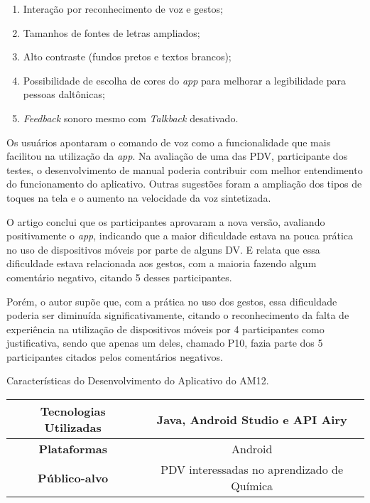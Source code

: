 \begin{enumerate}
  \item Interação por reconhecimento de voz e gestos;
  \item Tamanhos de fontes de letras ampliados;
  \item Alto contraste (fundos pretos e textos brancos);
  \item Possibilidade de escolha de cores do \emph{app} para melhorar a legibilidade para pessoas daltônicas;
  \item \emph{Feedback} sonoro mesmo com \emph{Talkback} desativado.
\end{enumerate}

Os usuários apontaram o comando de voz como a funcionalidade que mais facilitou na utilização da \emph{app}.
Na avaliação de uma das PDV, participante dos testes, o desenvolvimento de manual poderia contribuir com melhor entendimento do funcionamento do aplicativo.
Outras sugestões foram a ampliação dos tipos de toques na tela e o aumento na velocidade da voz sintetizada.

O artigo conclui que os participantes aprovaram a nova versão, avaliando positivamente o \emph{app}, indicando que a maior dificuldade estava na pouca prática no uso de dispositivos móveis por parte de alguns DV\@.
E relata que essa dificuldade estava relacionada aos gestos, com a maioria fazendo algum comentário negativo, citando 5 desses participantes.

Porém, o autor supõe que, com a prática no uso dos gestos, essa dificuldade poderia ser diminuída significativamente, citando o reconhecimento da falta de experiência na utilização de dispositivos móveis por 4 participantes como justificativa, sendo que apenas um deles, chamado P10, fazia parte dos 5 participantes citados pelos comentários negativos.

\begin{quadro}[htb!]
  \caption{\label{qua-car-am12}Características do Desenvolvimento do Aplicativo do AM12.}
  \begin{tabular}{|c|c|}
    \hline
    \textbf{Tecnologias Utilizadas} & Java, Android Studio e API Airy            \\ \hline
    \textbf{Plataformas}            & Android                                    \\ \hline
    \textbf{Público-alvo}           & PDV interessadas no aprendizado de Química \\
    \hline
  \end{tabular}
\end{quadro}

